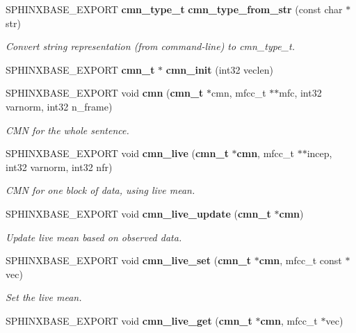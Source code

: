 \begin{DoxyCompactItemize}
\item 
S\-P\-H\-I\-N\-X\-B\-A\-S\-E\-\_\-\-E\-X\-P\-O\-R\-T {\bf cmn\-\_\-type\-\_\-t} {\bf cmn\-\_\-type\-\_\-from\-\_\-str} (const char $\ast$str)\label{cmn_8h_acf5e65a03a0d74630add4a400fed0ce8}

\begin{DoxyCompactList}\small\item\em Convert string representation (from command-\/line) to cmn\-\_\-type\-\_\-t. \end{DoxyCompactList}\item 
S\-P\-H\-I\-N\-X\-B\-A\-S\-E\-\_\-\-E\-X\-P\-O\-R\-T {\bf cmn\-\_\-t} $\ast$ {\bfseries cmn\-\_\-init} (int32 veclen)\label{cmn_8h_a7ba6ce5489afce232b9bb61bd2ebd20f}

\item 
S\-P\-H\-I\-N\-X\-B\-A\-S\-E\-\_\-\-E\-X\-P\-O\-R\-T void {\bf cmn} ({\bf cmn\-\_\-t} $\ast$cmn, mfcc\-\_\-t $\ast$$\ast$mfc, int32 varnorm, int32 n\-\_\-frame)
\begin{DoxyCompactList}\small\item\em C\-M\-N for the whole sentence. \end{DoxyCompactList}\item 
S\-P\-H\-I\-N\-X\-B\-A\-S\-E\-\_\-\-E\-X\-P\-O\-R\-T void {\bf cmn\-\_\-live} ({\bf cmn\-\_\-t} $\ast${\bf cmn}, mfcc\-\_\-t $\ast$$\ast$incep, int32 varnorm, int32 nfr)
\begin{DoxyCompactList}\small\item\em C\-M\-N for one block of data, using live mean. \end{DoxyCompactList}\item 
S\-P\-H\-I\-N\-X\-B\-A\-S\-E\-\_\-\-E\-X\-P\-O\-R\-T void {\bf cmn\-\_\-live\-\_\-update} ({\bf cmn\-\_\-t} $\ast${\bf cmn})\label{cmn_8h_ad63cc93b21560d4d33f866768775efd5}

\begin{DoxyCompactList}\small\item\em Update live mean based on observed data. \end{DoxyCompactList}\item 
S\-P\-H\-I\-N\-X\-B\-A\-S\-E\-\_\-\-E\-X\-P\-O\-R\-T void {\bf cmn\-\_\-live\-\_\-set} ({\bf cmn\-\_\-t} $\ast${\bf cmn}, mfcc\-\_\-t const $\ast$vec)\label{cmn_8h_ae2d0e4bdd885b433c93d5dacca09bb86}

\begin{DoxyCompactList}\small\item\em Set the live mean. \end{DoxyCompactList}\item 
S\-P\-H\-I\-N\-X\-B\-A\-S\-E\-\_\-\-E\-X\-P\-O\-R\-T void {\bf cmn\-\_\-live\-\_\-get} ({\bf cmn\-\_\-t} $\ast${\bf cmn}, mfcc\-\_\-t $\ast$vec)\label{cmn_8h_a3621707e373ae24bcd47b6aa691cbb3a}


\end{DoxyCompactItemize}
